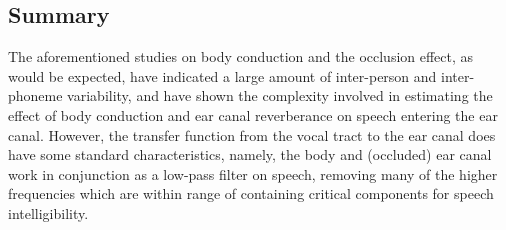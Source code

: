 \subsection{Summary}

The aforementioned studies on body conduction and the occlusion effect, as would be expected, have indicated a large amount of inter-person and inter-phoneme variability, and have shown the complexity involved in estimating the effect of body conduction and ear canal reverberance on speech entering the ear canal.  However, the transfer function from the vocal tract to the ear canal does have some standard characteristics, namely, the body and (occluded) ear canal work in conjunction as a low-pass filter on speech, removing many of the higher frequencies which are within range of containing critical components for speech intelligibility.






